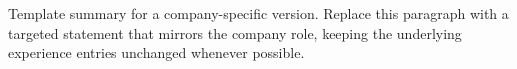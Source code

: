 
\begin{cvparagraph}

Template summary for a company-specific version. Replace this paragraph with a targeted statement that mirrors the company role, keeping the underlying experience entries unchanged whenever possible.

\end{cvparagraph}
